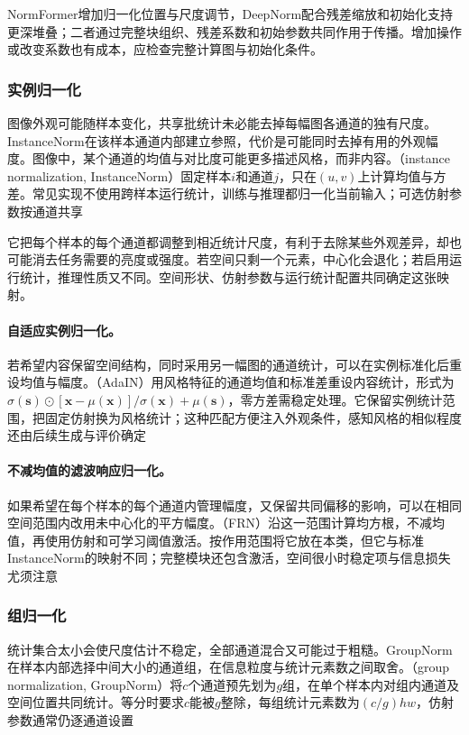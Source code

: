 NormFormer增加归一化位置与尺度调节，DeepNorm配合残差缩放和初始化支持更深堆叠；二者通过完整块组织、残差系数和初始参数共同作用于传播。增加操作或改变系数也有成本，应检查完整计算图与初始化条件。

\subsubsection{实例归一化}
\label{sec:training-instancenorm}
\label{sec:training-adaptive-instancenorm}
\label{sec:training-frn-pixelnorm}
\label{sec:training-frn}
图像外观可能随样本变化，共享批统计未必能去掉每幅图各通道的独有尺度。InstanceNorm在该样本通道内部建立参照，代价是可能同时去掉有用的外观幅度。图像中，某个通道的均值与对比度可能更多描述风格，而非内容。（instance normalization, InstanceNorm）固定样本$i$和通道$j$，只在$(u,v)$上计算均值与方差。常见实现不使用跨样本运行统计，训练与推理都归一化当前输入；可选仿射参数按通道共享

它把每个样本的每个通道都调整到相近统计尺度，有利于去除某些外观差异，却也可能消去任务需要的亮度或强度。若空间只剩一个元素，中心化会退化；若启用运行统计，推理性质又不同。空间形状、仿射参数与运行统计配置共同确定这张映射。

\paragraph{自适应实例归一化。}

若希望内容保留空间结构，同时采用另一幅图的通道统计，可以在实例标准化后重设均值与幅度。（AdaIN）用风格特征的通道均值和标准差重设内容统计，形式为$\sigma(\bm s)\odot[\bm x-\mu(\bm x)]/\sigma(\bm x)+\mu(\bm s)$，零方差需稳定处理。它保留实例统计范围，把固定仿射换为风格统计；这种匹配方便注入外观条件，感知风格的相似程度还由后续生成与评价确定

\paragraph{不减均值的滤波响应归一化。}

如果希望在每个样本的每个通道内管理幅度，又保留共同偏移的影响，可以在相同空间范围内改用未中心化的平方幅度。（FRN）沿这一范围计算均方根，不减均值，再使用仿射和可学习阈值激活。按作用范围将它放在本类，但它与标准InstanceNorm的映射不同；完整模块还包含激活，空间很小时稳定项与信息损失尤须注意

\subsubsection{组归一化}
\label{sec:training-groupnorm}
\label{sec:training-instance-groupnorm}
\label{sec:training-evonorm}
统计集合太小会使尺度估计不稳定，全部通道混合又可能过于粗糙。GroupNorm在样本内部选择中间大小的通道组，在信息粒度与统计元素数之间取舍。（group normalization, GroupNorm）将$c$个通道预先划为$g$组，在单个样本内对组内通道及空间位置共同统计。等分时要求$c$能被$g$整除，每组统计元素数为$(c/g)hw$，仿射参数通常仍逐通道设置

